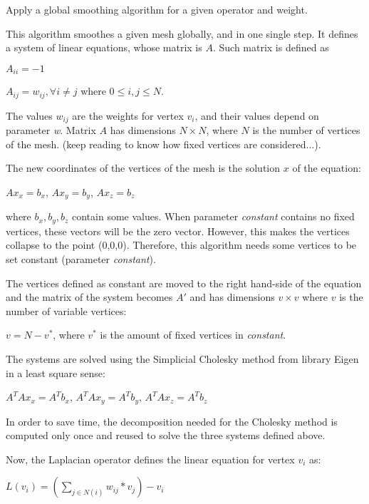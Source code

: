 Apply a global smoothing algorithm for a given operator and weight. 

This algorithm smoothes a given mesh globally, and in one single step. It defines a system of linear equations, whose matrix is $A$. Such matrix is defined as
\begin{DoxyItemize}
\item $A_{ii} = -1$
\item $A_{ij} = w_{ij}, \forall i \neq j$ where $ 0 \le i,j \le N$.
\end{DoxyItemize}

The values $w_{ij}$ are the weights for vertex $v_i$, and their values depend on parameter {\itshape w}. Matrix $A$ has dimensions $N \times N$, where $N$ is the number of vertices of the mesh. (keep reading to know how fixed vertices are considered...).

The new coordinates of the vertices of the mesh is the solution $x$ of the equation\+:

$Ax_x = b_x$, $Ax_y = b_y$, $Ax_z = b_z$

where $b_x,b_y,b_z$ contain some values. When parameter {\itshape constant} contains no fixed vertices, these vectors will be the zero vector. However, this makes the vertices collapse to the point (0,0,0). Therefore, this algorithm needs some vertices to be set constant (parameter {\itshape constant}).

The vertices defined as constant are moved to the right hand-\/side of the equation and the matrix of the system becomes $A'$ and has dimensions $v \times v$ where $v$ is the number of variable vertices\+:

$v = N - v^*$, where $v^*$ is the amount of fixed vertices in {\itshape constant}.

The systems are solved using the Simplicial Cholesky method from library Eigen in a least square sense\+:

$ A^TAx_x = A^Tb_x$, $A^TAx_y = A^Tb_y$, $A^TAx_z = A^Tb_z$

In order to save time, the decomposition needed for the Cholesky method is computed only once and reused to solve the three systems defined above.

Now, the Laplacian operator defines the linear equation for vertex $v_i$ as\+:

$L(v_i) = \left(\sum_{j \in N(i)} w_{ij}*v_j\right) - v_i$


